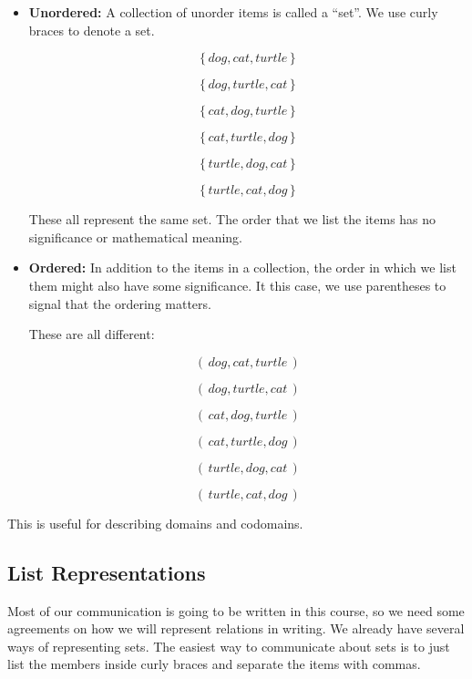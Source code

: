 \documentclass{ximera}
\begin{document}
\begin{itemize}
\item \textbf{\textcolor{blue!55!black}{Unordered:}}  A collection of unorder items is called a ``set''.  We use curly braces to denote a set.

\[
\{ \, dog, cat, turtle \, \}
\]

\[
\{ \, dog, turtle, cat \, \}
\]

\[
\{ \, cat, dog, turtle \, \}
\]

\[
\{ \, cat, turtle, dog \, \}
\]

\[
\{ \, turtle, dog, cat \, \}
\]

\[
\{ \, turtle, cat, dog \, \}
\]

These all represent the same set.  The order that we list the items has no significance or mathematical meaning.


\item \textbf{\textcolor{blue!55!black}{Ordered:}} In addition to the items in a collection, the order in which we list them might also have some significance.  It this case, we use parentheses to signal that the ordering matters.


These are all different:

\[
( \, dog, cat, turtle \, )
\]

\[
( \, dog, turtle, cat \, )
\]

\[
( \, cat, dog, turtle \, )
\]

\[
( \, cat, turtle, dog \, )
\]

\[
( \, turtle, dog, cat \, )
\]

\[
( \, turtle, cat, dog \, )
\]


\end{itemize}


This is useful for describing domains and codomains.  \\















\subsection*{List Representations}

Most of our communication is going to be written in this course, so we need some agreements on how we will represent relations in writing.  We already have several ways of representing sets.  The easiest way to communicate about sets is to just list the members inside curly braces and separate the items with commas.
\end{document}
